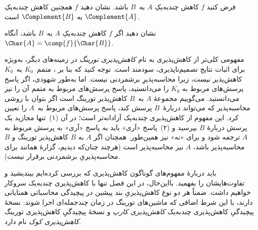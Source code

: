 \documentclass[../../../include/open-logic-section]{subfiles}
\begin{document}
\begin{prob}
فرض کنید $f$ کاهش چندبه‌یکِ $A$ به~$B$ باشد. نشان دهید $f$ همچنین
کاهش چندبه‌یکِ $\Complement{A}$ به $\Complement{B}$ است.
\end{prob}

\begin{prob}
نشان دهید اگر $f$ کاهش چندبه‌یکِ $A$ به~$B$ باشد، آنگاه
$\Char{A}=\comp{f}{\Char{B}}$.
\end{prob}

\begin{digress}
مفهومی کلی‌تر از کاهش‌پذیری به نام \emph{کاهش‌پذیری تورینگ} در
زمینه‌های دیگر، به‌ویژه برای اثبات نتایج تصمیم‌ناپذیری، سودمند است.
توجه کنید که بنا بر ، متمم~$K_0$ به~$K_0$
کاهش‌پذیر نیست، زیرا محاسبه‌پذیرِ برشمردنی نیست. اما به‌طور شهودی،
اگر پاسخ پرسش‌های مربوط به $K_0$ را می‌دانستید، پاسخ پرسش‌های مربوط
به متمم آن را نیز می‌دانستید. می‌گوییم مجموعهٔ $A$ به~$B$
کاهش‌پذیر تورینگ است اگر بتوان با روشی محاسبه‌پذیر که می‌تواند
دربارهٔ~$B$ پرسش کند، پاسخ پرسش‌های مربوط به~$A$ را تعیین کرد. این
مفهوم از کاهش‌پذیری چندبه‌یک آزادانه‌تر است؛ در آن (۱)~تنها مجازید یک
پرسش دربارهٔ $B$ بپرسید و (۲)~پاسخ «آری» باید به پاسخ «آری» به پرسش
مربوط به $A$ ترجمه شود و برای «نه» نیز همین‌طور. همچنان اگر $A$ به
$B$ کاهش‌پذیر تورینگ و $B$ محاسبه‌پذیر باشد، $A$ نیز محاسبه‌پذیر است
(هرچند چنان‌که دیدیم، گزارهٔ همانند برای محاسبه‌پذیریِ برشمردنی برقرار
نیست).

باید دربارهٔ مفهوم‌های گوناگون کاهش‌پذیری که بررسی کرده‌ایم بیندیشید
و تفاوت‌هایشان را بفهمید. بااین‌حال، در این فصل تنها با کاهش‌پذیری
چندبه‌یک سروکار خواهیم داشت. ضمناً هر دو نوع کاهش‌پذیریِ بند پیشین در
پیچیدگی محاسباتی همتایانی دارند، با این شرط اضافی که ماشین‌های تورینگ
در زمان چندجمله‌ای اجرا شوند: نسخهٔ پیچیدگیِ کاهش‌پذیری چندبه‌یک
\emph{کاهش‌پذیری کارپ} و نسخهٔ پیچیدگیِ کاهش‌پذیری تورینگ
\emph{کاهش‌پذیری کوک} نام دارد.
\end{digress}
\end{document}
